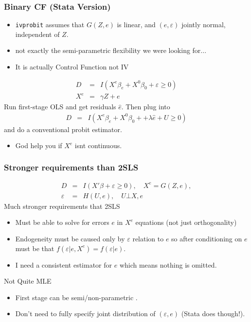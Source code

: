 \begin{frame}
\frametitle{Binary CF (Stata Version)}
\begin{itemize}
\item \texttt{ivprobit} assumes that $G(Z,e)$ is linear, and $(e,\varepsilon)$ jointly normal, independent of $Z$.
\item not exactly the semi-parametric flexibility we were looking for...
\item It is actually Control Function not IV
\end{itemize}
\begin{eqnarray*}
D &=& I ( X^e  \beta_e + X^0 \beta_0+ \varepsilon \geq 0 ) \\
 X^e &=& \gamma Z + e  
\end{eqnarray*}
Run first-stage OLS and get residuals $\hat{e}$. Then plug into
\begin{eqnarray*}
D &=& I ( X^e  \beta_e + X^0 \beta_0+ + \lambda \hat{e} + U  \geq 0 )
\end{eqnarray*}
and do a conventional probit estimator.
\begin{itemize}
\item God help you if $X^e$ isnt continuous.
\end{itemize}

\end{frame}

\begin{frame}
\frametitle{Stronger requirements than 2SLS}
\vspace{-10pt}
\begin{eqnarray*}
D &=& I ( X' \beta + \varepsilon \geq 0 ) , \quad  X^e = G(Z,e) ,  \\
\varepsilon &=& H(U,e) , \quad U \bot X,e
\end{eqnarray*}
Much stronger requirements that 2SLS
\begin{itemize}
\item Must be able to solve for errors $e$ in $X^e$ equations (not just orthogonality)
\item Endogeneity must be caused only by $\varepsilon$ relation to $e$ so after conditioning on $e$ must be that $f(\varepsilon | e, X^{e}) = f( \varepsilon | e)$.
\item I need a consistent estimator for $e$ which means nothing is omitted.
\end{itemize}
Not Quite MLE
\begin{itemize}
\item First stage can be semi/non-parametric .
\item Don't need to fully specify joint distribution of $(\varepsilon,e)$ (Stata does though!).
\end{itemize}


\end{frame}


